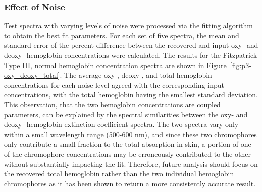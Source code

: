 \subsubsection{Effect of Noise}
Test spectra with varying levels of noise were processed via the fitting algorithm to obtain the best fit parameters. For each set of five spectra, the mean and standard error of the percent difference between the recovered and input oxy- and deoxy- hemoglobin concentrations were calculated. The results for the Fitzpatrick Type III, normal hemoglobin concentration spectra are shown in Figure~\ref{fig:p3-oxy_deoxy_total}. The average oxy-, deoxy-, and total hemoglobin concentrations for each noise level agreed with the corresponding input concentrations, with the total hemoglobin having the smallest standard deviation. This observation, that the two hemoglobin concentrations are coupled parameters, can be explained by the spectral similarities between the oxy- and deoxy- hemoglobin extinction coefficient spectra. The two spectra vary only within a small wavelength range (500-600 nm), and since these two chromophores only contribute a small fraction to the total absorption in skin, a portion of one of the chromophore concentrations may be erroneously contributed to the other without substantially impacting the fit. Therefore, future analysis should focus on the recovered total hemoglobin rather than the two individual hemoglobin chromophores as it has been shown to return a more consistently accurate result.

